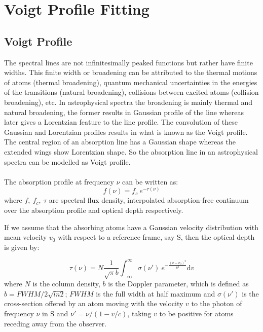 \chapter{Voigt Profile Fitting}  \label{chap:VPFIT}

\section{Voigt Profile}

The spectral lines are not infinitesimally peaked functions but rather have finite widths. This finite width or broadening can be attributed to the thermal motions of atoms (thermal broadening), quantum mechanical uncertainties in the energies of the transitions (natural broadening), collisions between excited atoms (collision broadening), etc. In astrophysical spectra the broadening is mainly thermal and natural broadening, the former results in Gaussian profile of the line whereas later gives a Lorentzian feature to the line profile. The convolution of these Gaussian and Lorentzian profiles results in what is known as the Voigt profile. The central region of an absorption line has a Gaussian shape whereas the extended wings show Lorentzian shape. So the absorption line in an astrophysical spectra can be modelled as Voigt profile. 
\\\\
The absorption profile at frequency $\nu$ can be written as:
\begin{equation*}
f(\nu)=f_{c} \ e^{-\tau(\nu)}
\end{equation*}
where $f, \ f_{c}, \ \tau$ are spectral flux density, interpolated absorption-free continuum over the absorption profile and optical depth respectively.

If we assume that the absorbing atoms have a Gaussian velocity distribution with mean velocity $v_0$ with respect to a reference frame, say S, then the optical depth is given by:

\begin{equation}  \label{eqn:tau}
\tau(\nu)=N \frac{1}{\sqrt{\pi}b}\int_{-\infty}^{\infty}\sigma(\nu')\ e^{-\frac{(v-v_0)^2}{b^2}} \text{d}v 
\end{equation}
where $N$ is the column density, $b$ is the Doppler parameter, which is defined as $b=FWHM/2\sqrt{ln2}$; $FWHM$ is the full width at half maximum and $\sigma(\nu')$ is the cross-section offered by an atom moving with the velocity $v$ to the photon of frequency $\nu$ in S and $\nu'=\nu/(1-v/c)$, taking $v$ to be positive for atoms receding away from the observer.  


